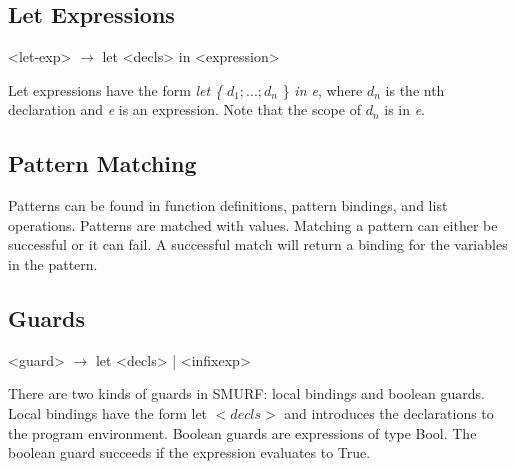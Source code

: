 \subsection{Let Expressions}
\begin{grammar}
<let-exp> $\rightarrow$ let <decls> in <expression>
\end{grammar}
Let expressions have the form \emph{let \{} $d_1;...;d_n$ \} \emph{in e}, where $d_n$ is the nth declaration and \emph{e} is an expression. Note that the scope of $d_n$ is in \emph{e}.


\subsection{Pattern Matching}

Patterns can be found in function definitions, pattern bindings, and list operations. Patterns are matched with values. Matching a pattern can either be successful or it can fail. A successful match will return  a binding for the variables in the pattern. 

\subsection{Guards}
\begin{grammar}
<guard> $\rightarrow$  let <decls> | <infixexp>          
\end{grammar}

There are two kinds of guards in SMURF: local bindings and boolean guards. Local bindings have the form let $<decls>$ and introduces the declarations to the program environment. Boolean guards are expressions of type Bool. The boolean guard succeeds if the expression evaluates to True.

